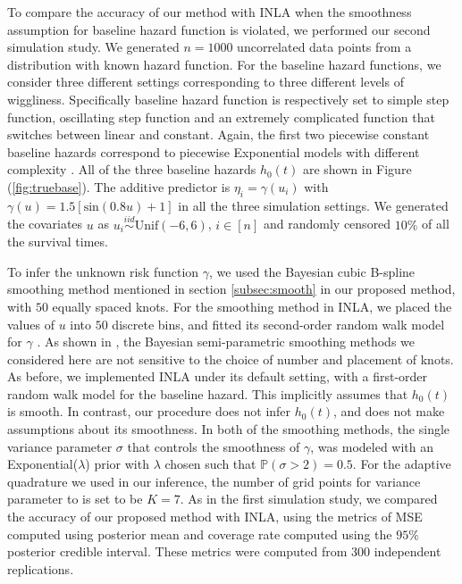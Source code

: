 \documentclass[ba]{imsart}
\begin{document}
To compare the accuracy of our method with INLA when the smoothness assumption for baseline hazard function is violated, we performed our second simulation study. We generated $n = 1000$ uncorrelated data points from a distribution with known hazard function. For the baseline hazard functions, we consider three different settings corresponding to three different levels of wiggliness. Specifically baseline hazard function is respectively set to simple step function, oscillating step function and an extremely complicated function that switches between linear and constant. Again, the first two piecewise constant baseline hazards correspond to piecewise Exponential models with different complexity \citep{piecewiseExp}. All of the three baseline hazards $h_{0}(t)$ are shown in Figure (\ref{fig:truebase}). The additive predictor is $\eta_{i} = \gamma\left(u_{i}\right)$ with $\gamma(u) = 1.5 [ \text{sin}(0.8u) + 1 ]$ in all the three simulation settings. We generated the covariates $u$ as  $u_{i}\overset{iid}{\sim}\text{Unif}(-6,6)$, $i \in [n]$ and randomly censored $10\%$ of all the survival times.

To infer the unknown risk function $\gamma$, we used the Bayesian cubic B-spline smoothing method mentioned in section \ref{subsec:smooth} in our proposed method, with $50$ equally spaced knots. For the smoothing method in INLA, we placed the values of $u$ into $50$ discrete bins, and fitted its second-order random walk model for $\gamma$ \citep{rw2}. As shown in \cite{casecross}, the Bayesian semi-parametric smoothing methods we considered here are not sensitive to the choice of number and placement of knots. 
As before, we implemented INLA under its default setting, with a first-order random walk model for the baseline hazard. This implicitly assumes that $h_{0}(t)$ is smooth. In contrast, our procedure does not infer $h_{0}(t)$, and does not make assumptions about its smoothness. In both of the smoothing methods, the single variance parameter $\sigma$ that controls the smoothness of $\gamma$, was modeled with an Exponential($\lambda$) prior with $\lambda$ chosen such that $\mathbb{P}\left( \sigma > 2\right) = 0.5$. For the adaptive quadrature we used in our inference, the number of grid points for variance parameter to is set to be $K = 7$. As in the first simulation study, we compared the accuracy of our proposed method with INLA, using the metrics of MSE computed using posterior mean and coverage rate computed using the $95\%$ posterior credible interval. These metrics were computed from 300 independent replications.
\end{document}
